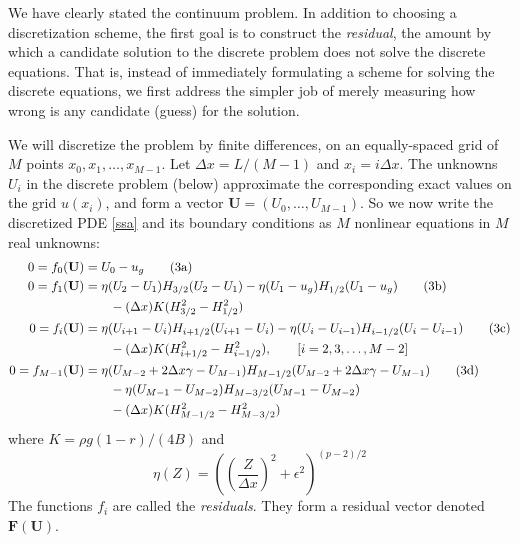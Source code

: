 \documentclass[11pt,final,reqno]{amsart}
\newcommand{\eps}{\epsilon}
\newcommand{\bbF}{\mathbf{F}}
\newcommand{\bU}{\mathbf{U}}
\begin{document}
We have clearly stated the continuum problem.  In addition to choosing a discretization scheme, the first goal is to construct the \emph{residual}, the amount by which a candidate solution to the discrete problem does not solve the discrete equations.  That is, instead of immediately formulating a scheme for solving the discrete equations, we first address the simpler job of merely measuring how wrong is any candidate (guess) for the solution.

We will discretize the problem by finite differences, on an equally-spaced grid of $M$ points $x_0,x_1,\dots,x_{M-1}$.  Let $\Delta x = L / (M-1)$ and $x_i = i \Delta x$.  The unknowns $U_i$ in the discrete problem (below) approximate the corresponding exact values on the grid $u(x_i)$, and form a vector $\bU = (U_0,\dots,U_{M-1})$.  So we now write the discretized PDE \eqref{ssa} and its boundary conditions as $M$ nonlinear equations in $M$ real unknowns:
\begin{align}
  0 = f_0(\bU) &= U_0 - u_g \tag{3a} \label{reszero} \\
  0 = f_1(\bU) &= \eta(U_2-U_1) H_{3/2} (U_2 - U_1) - \eta(U_1 - u_g) H_{1/2} (U_1 - u_g) \tag{3b} \label{resone}\\
               &\qquad - (\Delta x) K (H_{3/2}^2 - H_{1/2}^2) \notag \\
  0 = f_i(\bU) &= \eta(U_{i+1}-U_i) H_{i+1/2} (U_{i+1} - U_i) - \eta(U_i - U_{i-1}) H_{i-1/2} (U_i - U_{i-1}) \tag{3c}  \label{resi}\\
               &\qquad - (\Delta x) K (H_{i+1/2}^2 - H_{i-1/2}^2), \qquad [i=2,3,\dots,M-2] \notag \\
  0 = f_{M-1}(\bU) &= \eta(U_{M-2} + 2\Delta x \gamma - U_{M-1}) H_{M-1/2} (U_{M-2} + 2\Delta x \gamma - U_{M-1})  \tag{3d} \label{resend} \\
               &\qquad - \eta(U_{M-1} - U_{M-2}) H_{M-3/2} (U_{M-1} - U_{M-2}) \notag\\
               &\qquad - (\Delta x) K (H_{M-1/2}^2 - H_{M-3/2}^2) \notag
\end{align}
where $K = \rho g (1-r)/(4 B)$ and \setcounter{equation}{3}
\begin{equation}
  \eta(Z) = \left(\left(\frac{Z}{\Delta x}\right)^2 + \eps^2\right)^{(p-2)/2} \label{visc}
\end{equation}
The functions $f_i$ are called the \emph{residuals}.  They form a residual vector denoted $\bbF(\bU)$.
\end{document}
